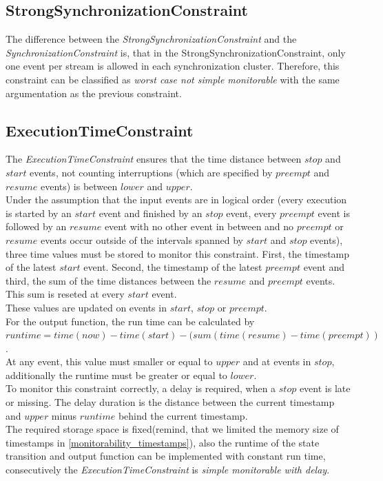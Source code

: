 	
\subsection{StrongSynchronizationConstraint}
	The difference between the \emph{StrongSynchronizationConstraint} and the \emph{SynchronizationConstraint} is, that in the StrongSynchronizationConstraint, only one event per stream is allowed in each synchronization cluster. Therefore, this constraint can be classified as \textit{worst case not simple monitorable} with the same argumentation as the previous constraint.
	
	
\subsection{ExecutionTimeConstraint}
	The \emph{ExecutionTimeConstraint} ensures that the time distance between $stop$ and $start$ events, not counting interruptions (which are specified by $preempt$ and $resume$ events) is between $lower$ and $upper$.\\
	Under the assumption that the input events are in logical order (every execution is started by an $start$ event and finished by an $stop$ event, every $preempt$ event is followed by an $resume$ event with no other event in between and no $preempt$ or $resume$ events occur outside of the intervals spanned by $start$ and $stop$ events), three time values must be stored to monitor this constraint. First, the timestamp of the latest $start$ event. Second, the timestamp of the latest $preempt$ event and third, the sum of the time distances between the $resume$ and $preempt$ events. This sum is reseted at every $start$ event.\\
	These values are updated on events in $start$, $stop$ or $preempt$.\\
	For the output function, the run time can be calculated by\\ $runtime = time(now) - time(start) - (sum(time(resume) - time(preempt))$.\\ At any event, this value must smaller or equal to $upper$ and at events in $stop$, additionally the runtime must be greater or equal to $lower$. \\
	To monitor this constraint correctly, a delay is required, when a $stop$ event is late or missing. The delay duration is the distance between the current timestamp and $upper$ minus $runtime$ behind the current timestamp.\\
	The required storage space is fixed(remind, that we limited the memory size of timestamps in \ref{monitorability_timestamps}), also the runtime of the state transition and output function can be implemented with constant run time, consecutively the \emph{ExecutionTimeConstraint} is \textit{simple monitorable with delay}.


